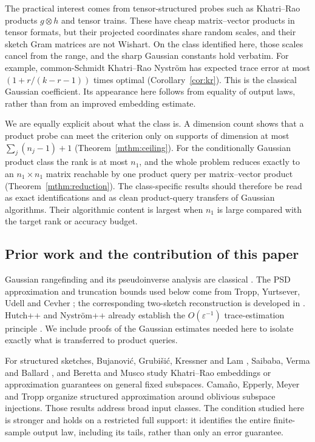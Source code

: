 \documentclass[11pt,a4paper]{article}
\theoremstyle{definition}
\theoremstyle{remark}
\numberwithin{equation}{section}
\newcommand{\eps}{\varepsilon}
\begin{document}
The practical interest comes from tensor-structured probes such as
Khatri--Rao products $g\otimes h$ and tensor trains. These have cheap
matrix--vector products in tensor formats, but their projected coordinates
share random scales, and their sketch Gram matrices are not Wishart. On the
class identified here, those scales cancel from the range, and the sharp
Gaussian constants hold verbatim. For example, common-Schmidt Khatri--Rao
Nystr\"om has expected trace error at most $(1+r/(k-r-1))$ times optimal
(Corollary~\ref{cor:kr}). This is the classical Gaussian coefficient. Its
appearance here follows from equality of output laws, rather than from an
improved embedding estimate.

We are equally explicit about what the class is. A dimension count shows
that a product probe can meet the criterion only on supports of dimension at
most $\sum_j(n_j-1)+1$ (Theorem~\ref{mthm:ceiling}). For the conditionally
Gaussian product class the rank is at most $n_1$, and the whole problem
reduces exactly to an $n_1\times n_1$ matrix reachable by one product query
per matrix--vector product (Theorem~\ref{mthm:reduction}). The class-specific
results should therefore be read as exact identifications and as clean
product-query transfers of Gaussian algorithms. Their algorithmic content is
largest when $n_1$ is large compared with the target rank or accuracy budget.

\subsection{Prior work and the contribution of this paper}

Gaussian rangefinding and its pseudoinverse analysis are classical
\cite{HMT}. The PSD approximation and truncation bounds used below come from
Tropp, Yurtsever, Udell and Cevher \cite{TYUCpsd}; the corresponding two-sketch
reconstruction is developed in \cite{TYUCgeneral,Nak}. Hutch++ and
Nystr\"om++ already establish the $O(\eps^{-1})$ trace-estimation principle
\cite{Hutchpp,Nyspp}. We include proofs of the Gaussian estimates needed here
to isolate exactly what is transferred to product queries.

For structured sketches, Bujanovi\'c, Grubi\v{s}i\'c, Kressner and Lam
\cite{BGKL}, Saibaba, Verma and Ballard \cite{SVB}, and Beretta and Musco
\cite{BM} study Khatri--Rao embeddings or approximation guarantees on general
fixed subspaces. Cama\~no, Epperly, Meyer and Tropp \cite{CEMT} organize
structured approximation around oblivious subspace injections. Those results
address broad input classes. The condition studied here is stronger and
holds on a restricted full support: it identifies the entire finite-sample
output law, including its tails, rather than only an error guarantee.
\end{document}
